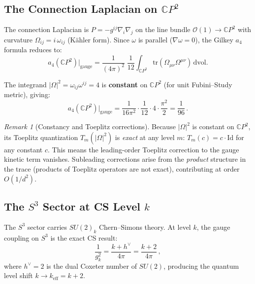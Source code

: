 \documentclass[12pt,a4paper]{article}
\theoremstyle{definition}
\theoremstyle{remark}
\newtheorem{remark}{Remark}
\begin{document}
\subsection{The Connection Laplacian on $\mathbb{C}P^2$}

The connection Laplacian is $P = -g^{ij}\nabla_i\nabla_j$ on the line
bundle $\mathcal{O}(1) \to \mathbb{C}P^2$ with curvature
$\Omega_{ij} = i\,\omega_{ij}$ (K\"ahler form).  Since $\omega$ is
parallel ($\nabla\omega = 0$), the Gilkey $a_4$ formula reduces to:
\begin{equation}
a_4(\mathbb{C}P^2)\big|_{\text{gauge}}
= \frac{1}{(4\pi)^2}\;\frac{1}{12}
\int_{\mathbb{C}P^2} \mathrm{tr}(\Omega_{\mu\nu}\Omega^{\mu\nu})\,\mathrm{dvol}.
\end{equation}

The integrand $|\Omega|^2 = \omega_{ij}\omega^{ij} = 4$ is
\textbf{constant} on $\mathbb{C}P^2$ (for unit Fubini--Study metric),
giving:
\begin{equation}
a_4(\mathbb{C}P^2)\big|_{\text{gauge}}
= \frac{1}{16\pi^2} \cdot \frac{1}{12} \cdot 4 \cdot \frac{\pi^2}{2}
= \frac{1}{96}\,.
\end{equation}

\begin{remark}[Constancy and Toeplitz corrections]
Because $|\Omega|^2$ is constant on $\mathbb{C}P^2$, its Toeplitz
quantization $T_m(|\Omega|^2)$ is \emph{exact} at any level $m$:
$T_m(c) = c \cdot \mathrm{Id}$ for any constant $c$.  This means the
leading-order Toeplitz correction to the gauge kinetic term vanishes.
Subleading corrections arise from the \emph{product} structure in the
trace (products of Toeplitz operators are not exact), contributing at
order $O(1/d^2)$.
\end{remark}

\subsection{The $S^3$ Sector at CS Level $k$}

The $S^3$ sector carries $SU(2)_k$ Chern--Simons theory.  At level $k$,
the gauge coupling on $S^3$ is the exact CS result:
\begin{equation}\label{eq:CS-coupling}
\frac{1}{g_k^2} = \frac{k + h^\vee}{4\pi} = \frac{k+2}{4\pi}\,,
\end{equation}
where $h^\vee = 2$ is the dual Coxeter number of $SU(2)$, producing the
quantum level shift $k \to k_{\mathrm{eff}} = k + 2$.
\end{document}
